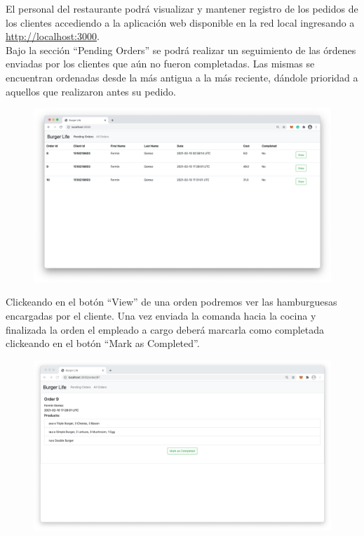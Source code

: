 \documentclass[a4paper,12pt]{article}
\begin{document}
El personal del restaurante podrá visualizar y mantener registro de los pedidos de los clientes accediendo a la aplicación web disponible en la red local ingresando a 
\color{blue}\uline{http://localhost:3000}\color{black}.
\\
Bajo la sección “Pending Orders” se podrá realizar un seguimiento de las órdenes enviadas por los clientes que aún no fueron completadas. Las mismas se encuentran ordenadas desde la más antigua a la más reciente, dándole prioridad a aquellos que realizaron antes su pedido.

\begin{figure}[H]
	\centering
	\includegraphics[width=1.0\linewidth]{webapp-pending-orders}
\end{figure}

Clickeando en el botón “View” de una orden podremos ver las hamburguesas encargadas por el cliente. Una vez enviada la comanda hacia la cocina y finalizada la orden el empleado a cargo deberá marcarla como completada clickeando en el botón “Mark as Completed”.

\begin{figure}[H]
	\centering
	\includegraphics[width=1.0\linewidth]{webapp-order}
\end{figure}
\end{document}
